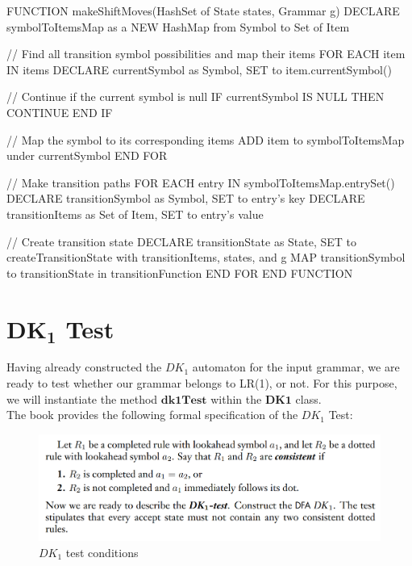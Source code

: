 \begin{codeblock}
    FUNCTION makeShiftMoves(HashSet of State states, Grammar g)
    DECLARE symbolToItemsMap as a NEW HashMap from Symbol to Set of Item

    // Find all transition symbol possibilities and map their items
    FOR EACH item IN items
    DECLARE currentSymbol as Symbol, SET to item.currentSymbol()

    // Continue if the current symbol is null
    IF currentSymbol IS NULL THEN
    CONTINUE
    END IF

    // Map the symbol to its corresponding items
    ADD item to symbolToItemsMap under currentSymbol
    END FOR

    // Make transition paths
    FOR EACH entry IN symbolToItemsMap.entrySet()
    DECLARE transitionSymbol as Symbol, SET to entry's key
    DECLARE transitionItems as Set of Item, SET to entry's value

    // Create transition state
    DECLARE transitionState as State, SET to createTransitionState with transitionItems, states, and g
    MAP transitionSymbol to transitionState in transitionFunction
    END FOR
    END FUNCTION
\end{codeblock}

\newpage


\section{\(\boldsymbol{DK_{1}}\) Test}\label{sec:DK1 Test}

Having already constructed the \(DK_{1}\) automaton for the input grammar, we are ready to test whether our grammar belongs to LR(1), or not. For this purpose, we will instantiate the method \(\boldsymbol{dk1Test}\) within the \(\boldsymbol{DK1}\) class.\\

The book provides the following formal specification of the \(DK_{1}\) Test:


\begin{figure}[h!]
    \includegraphics[width=\linewidth]{DK1 test conditions.png}
    \caption{\(DK_{1}\) test conditions}
    \label{4}
\end{figure}


